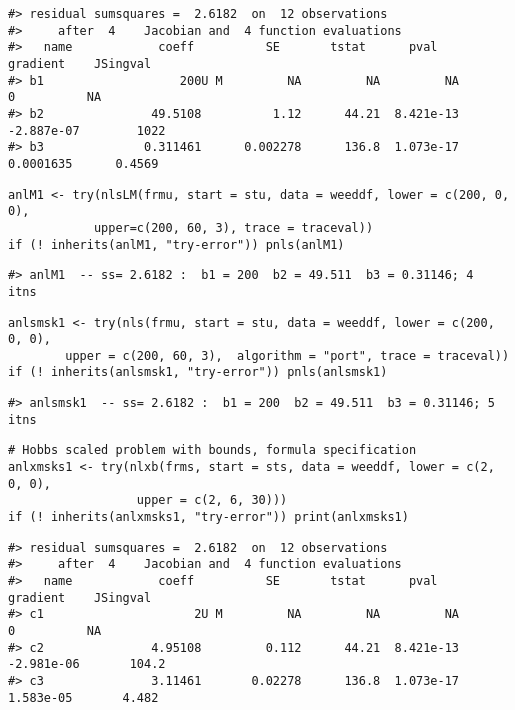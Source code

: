 \begin{verbatim}
#> residual sumsquares =  2.6182  on  12 observations
#>     after  4    Jacobian and  4 function evaluations
#>   name            coeff          SE       tstat      pval      gradient    JSingval   
#> b1                   200U M         NA         NA         NA           0          NA  
#> b2               49.5108          1.12      44.21  8.421e-13  -2.887e-07        1022  
#> b3              0.311461      0.002278      136.8  1.073e-17   0.0001635      0.4569
\end{verbatim}

\begin{verbatim}
anlM1 <- try(nlsLM(frmu, start = stu, data = weeddf, lower = c(200, 0, 0), 
            upper=c(200, 60, 3), trace = traceval))
if (! inherits(anlM1, "try-error")) pnls(anlM1)
\end{verbatim}

\begin{verbatim}
#> anlM1  -- ss= 2.6182 :  b1 = 200  b2 = 49.511  b3 = 0.31146; 4  itns
\end{verbatim}

\begin{verbatim}
anlsmsk1 <- try(nls(frmu, start = stu, data = weeddf, lower = c(200, 0, 0), 
        upper = c(200, 60, 3),  algorithm = "port", trace = traceval))
if (! inherits(anlsmsk1, "try-error")) pnls(anlsmsk1)
\end{verbatim}

\begin{verbatim}
#> anlsmsk1  -- ss= 2.6182 :  b1 = 200  b2 = 49.511  b3 = 0.31146; 5  itns
\end{verbatim}

\begin{verbatim}
# Hobbs scaled problem with bounds, formula specification
anlxmsks1 <- try(nlxb(frms, start = sts, data = weeddf, lower = c(2, 0, 0),
                  upper = c(2, 6, 30)))
if (! inherits(anlxmsks1, "try-error")) print(anlxmsks1)
\end{verbatim}

\begin{verbatim}
#> residual sumsquares =  2.6182  on  12 observations
#>     after  4    Jacobian and  4 function evaluations
#>   name            coeff          SE       tstat      pval      gradient    JSingval   
#> c1                     2U M         NA         NA         NA           0          NA  
#> c2               4.95108         0.112      44.21  8.421e-13  -2.981e-06       104.2  
#> c3               3.11461       0.02278      136.8  1.073e-17   1.583e-05       4.482
\end{verbatim}

